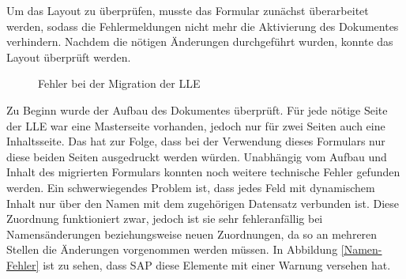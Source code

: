 Um das Layout zu überprüfen, musste das Formular zunächst überarbeitet werden, sodass die Fehlermeldungen nicht mehr die Aktivierung des Dokumentes verhindern. Nachdem die nötigen Änderungen durchgeführt wurden, konnte das Layout überprüft werden. 
\begin{figure}[ht]
	\centering
	\caption{Fehler bei der Migration der \acs{LLE}}
	\label{Migration}
\end{figure}

Zu Beginn wurde der Aufbau des Dokumentes überprüft. Für jede nötige Seite der \ac{LLE} war eine Masterseite vorhanden, jedoch nur für zwei Seiten auch eine Inhaltsseite. Das hat zur Folge, dass bei der Verwendung dieses Formulars nur diese beiden Seiten ausgedruckt werden würden. Unabhängig vom Aufbau und Inhalt des migrierten Formulars konnten noch weitere technische Fehler gefunden werden. Ein schwerwiegendes Problem ist, dass jedes Feld mit dynamischem Inhalt nur über den Namen mit dem zugehörigen Datensatz verbunden ist. Diese Zuordnung funktioniert zwar, jedoch ist sie sehr fehleranfällig bei Namensänderungen beziehungsweise neuen Zuordnungen, da so an mehreren Stellen die Änderungen vorgenommen werden müssen. In Abbildung \ref{Namen-Fehler} ist zu sehen, dass SAP diese Elemente mit einer Warnung versehen hat.




